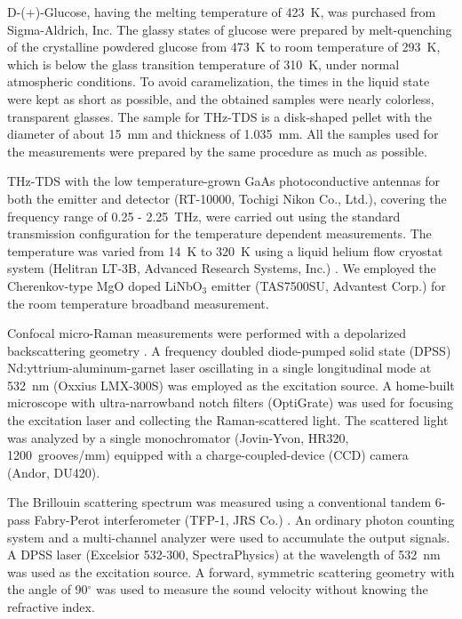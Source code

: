 \documentclass[%
 reprint,
superscriptaddress,
 amsmath,amssymb,
 aps,
prb,
]{revtex4-1}
\begin{document}
D-(+)-Glucose, having the melting temperature of 423~K\cite{Hurtta2004}, was purchased from Sigma-Aldrich, Inc. The glassy states of glucose were prepared by melt-quenching of the crystalline powdered glucose from 473~K to room temperature of 293~K, which is below the glass transition temperature of 310~K\cite{Wungtanagorn2001}, under normal atmospheric conditions. To avoid caramelization, the times in the liquid state were kept as short as possible, and the obtained samples were nearly colorless, transparent glasses. The sample for THz-TDS is a disk-shaped pellet with the diameter of about 15~mm and thickness of 1.035~mm. All the samples used for the measurements were prepared by the same procedure as much as possible.

THz-TDS with the low temperature-grown GaAs photoconductive antennas for both the emitter and detector (RT-10000, Tochigi Nikon Co., Ltd.), covering the frequency range of 0.25 - 2.25~THz, were carried out using the standard transmission configuration for the temperature dependent measurements. The temperature was varied from 14~K to 320~K using a liquid helium flow cryostat system (Helitran LT-3B, Advanced Research Systems, Inc.) \cite{Igawa2014, Helal2015, Shibata2015}. We employed the Cherenkov-type MgO doped LiNbO$_3$ emitter (TAS7500SU, Advantest Corp.) \cite{Igawa2014, Mori2014IOP, Kojima2014IOP, Shibata2015} for the room temperature broadband measurement.

Confocal micro-Raman measurements were performed with a depolarized backscattering geometry \cite{Fujii2016}. A frequency doubled diode-pumped solid state (DPSS)  Nd:yttrium-aluminum-garnet laser oscillating in a single longitudinal mode at 532~nm (Oxxius LMX-300S) was employed as the excitation source. A home-built microscope with  ultra-narrowband  notch  filters  (OptiGrate) was used for focusing the excitation laser and collecting the Raman-scattered  light. The scattered light was analyzed by a single monochromator  (Jovin-Yvon, HR320, 1200~grooves/mm) equipped with a charge-coupled-device (CCD) camera (Andor, DU420). 

The Brillouin scattering spectrum was measured using a conventional tandem 6-pass Fabry-Perot interferometer (TFP-1, JRS Co.) \cite{Ko2013}. An ordinary photon counting system and a multi-channel analyzer were used to accumulate the output signals. A DPSS laser (Excelsior 532-300, SpectraPhysics) at the wavelength of 532~nm was used as the excitation source. A forward, symmetric scattering geometry with the angle of 90$^\circ$ was used to measure the sound velocity without knowing the refractive index.
\end{document}
